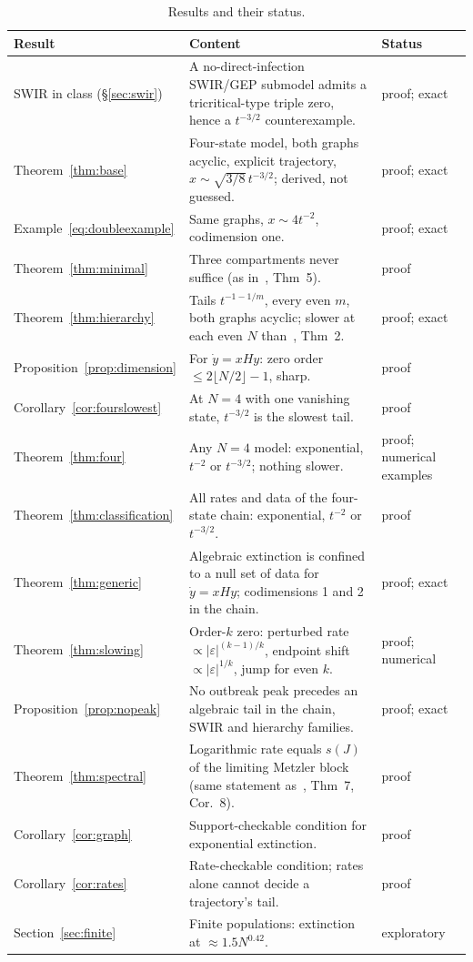\documentclass[11pt,a4paper]{article}
\theoremstyle{definition}\newtheorem{definition}[theorem]{Definition}
\theoremstyle{remark}\newtheorem{remark}[theorem]{Remark}
\begin{document}
\begin{table}[ht]
\centering\small
\begin{tabularx}{\textwidth}{@{}p{4.2cm}X p{1.9cm}@{}}
\toprule
Result & Content & Status\\
\midrule
SWIR in class (\S\ref{sec:swir}) & A no-direct-infection SWIR/GEP submodel admits a tricritical-type triple zero, hence a $t^{-3/2}$ counterexample. & proof; exact\\
Theorem~\ref{thm:base} & Four-state model, both graphs acyclic, explicit trajectory, $x\sim\sqrt{3/8}\,t^{-3/2}$; derived, not guessed. & proof; exact\\
Example~\eqref{eq:doubleexample} & Same graphs, $x\sim4t^{-2}$, codimension one. & proof; exact\\
Theorem~\ref{thm:minimal} & Three compartments never suffice (as in~\cite{EPprior}, Thm~5). & proof\\
Theorem~\ref{thm:hierarchy} & Tails $t^{-1-1/m}$, every even $m$, both graphs acyclic; slower at each even $N$ than~\cite{EPprior}, Thm~2. & proof; exact\\
Proposition~\ref{prop:dimension} & For $\dot y=xHy$: zero order $\le2\lfloor N/2\rfloor-1$, sharp. & proof\\
Corollary~\ref{cor:fourslowest} & At $N=4$ with one vanishing state, $t^{-3/2}$ is the slowest tail. & proof\\
Theorem~\ref{thm:four} & Any $N=4$ model: exponential, $t^{-2}$ or $t^{-3/2}$; nothing slower. & proof; numerical examples\\
Theorem~\ref{thm:classification} & All rates and data of the four-state chain: exponential, $t^{-2}$ or $t^{-3/2}$. & proof\\
Theorem~\ref{thm:generic} & Algebraic extinction is confined to a null set of data for $\dot y=xHy$; codimensions 1 and 2 in the chain. & proof; exact\\
Theorem~\ref{thm:slowing} & Order-$k$ zero: perturbed rate $\propto|\varepsilon|^{(k-1)/k}$, endpoint shift $\propto|\varepsilon|^{1/k}$, jump for even $k$. & proof; numerical\\
Proposition~\ref{prop:nopeak} & No outbreak peak precedes an algebraic tail in the chain, SWIR and hierarchy families. & proof; exact\\
Theorem~\ref{thm:spectral} & Logarithmic rate equals $s(J)$ of the limiting Metzler block (same statement as~\cite{EPprior}, Thm~7, Cor.~8). & proof\\
Corollary~\ref{cor:graph} & Support-checkable condition for exponential extinction. & proof\\
Corollary~\ref{cor:rates} & Rate-checkable condition; rates alone cannot decide a trajectory's tail. & proof\\
Section~\ref{sec:finite} & Finite populations: extinction at $\approx1.5N^{0.42}$. & exploratory\\
\bottomrule
\end{tabularx}
\caption{Results and their status.}
\label{tab:contributions}
\end{table}
\end{document}
